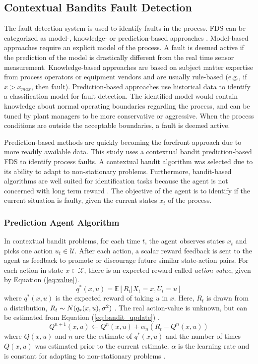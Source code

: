 \subsection{Contextual Bandits Fault Detection}
The fault detection system is used to identify faults in the process.  FDS can be categorized as model-, knowledge- or prediction-based approaches \cite{ftcs_diagnosis_ref7}. Model-based approaches require an explicit model of the process.  A fault is deemed active if the prediction of the model is drastically different from the real time sensor measurement.  Knowledge-based approaches are based on subject matter expertise from process operators or equipment vendors and are usually rule-based (e.g., if $x > x_{max}$, then fault). Prediction-based approaches use historical data to identify a classification model for fault detection. The identified model would contain knowledge about normal operating boundaries regarding the process, and can be tuned by plant managers to be more conservative or aggressive. When the process conditions are outside the acceptable boundaries, a fault is deemed active. 

Prediction-based methods are quickly becoming the forefront approach due to more readily available data. This study uses a contextual bandit prediction-based FDS to identify process faults. A contextual bandit algorithm was selected due to its ability to adapt to non-stationary problems.  Furthermore, bandit-based algorithms are well suited for identification tasks because the agent is not concerned with long term reward \cite{sutton}. The objective of the agent is to identify if the current situation is faulty, given the current states $x_t$ of the process. 

\subsubsection{Prediction Agent Algorithm}

In contextual bandit problems, for each time $t$, the agent observes states $x_t$ and picks one action $u_t \in \mathcal{U}$.  After each action, a scalar reward feedback is sent to the agent as feedback to promote or discourage future similar state-action pairs.  For each action in state $x \in \mathcal{X}$, there is an expected reward called \textit{action value}, given by Equation (\ref{eq:value}).
\begin{equation}
    q^*(x, u) = {\mathbb{E}} [R_t | X_t = x, U_t = u]
    \label{eq:value}
\end{equation}
where $q^*(x, u)$ is the expected reward of taking $u$ in $x$. Here, $R_t$ is drawn from a distribution, $R_t \thicksim N(q_*(x, u), \sigma^2)$ \cite{sutton}. The real action-value is unknown, but can be estimated from Equation (\ref{eq:bandit_update}) \cite{bandits_ref9}.
\begin{equation}
    Q^{n+1}(x, u) \leftarrow Q^n(x, u) + \alpha_n (R_t - Q^n(x, u))
    \label{eq:bandit_update}
\end{equation}
where $Q(x, u)$ and $n$ are the estimate of $q^*(x, u)$ and the number of times $Q(x, u)$ was estimated prior to the current estimate.  $\alpha$ is the learning rate and is constant for adapting to non-stationary problems \cite{sutton}.  

